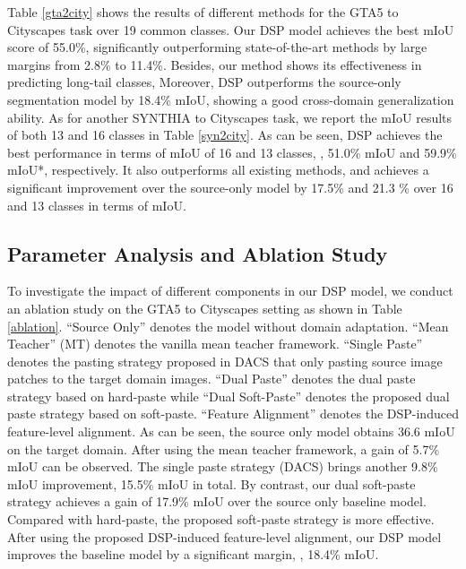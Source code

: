 \documentclass[sigconf]{acmart}
\begin{document}
Table \ref{gta2city} shows the results of different methods for the GTA5 to Cityscapes task over 19 common classes. Our DSP model achieves the best mIoU score of 55.0\%, significantly outperforming state-of-the-art methods by large margins from 2.8\% to 11.4\%. Besides, our method shows its effectiveness in predicting long-tail classes, Moreover, DSP outperforms the source-only segmentation model by 18.4\% mIoU, showing a good cross-domain generalization ability. As for another SYNTHIA to Cityscapes task, we report the mIoU results of both 13 and 16 classes in Table \ref{syn2city}. As can be seen, DSP achieves the best performance in terms of mIoU of 16 and 13 classes, , 51.0\% mIoU and 59.9\% mIoU*, respectively. It also outperforms all existing methods, and achieves a significant improvement over the source-only model by 17.5\% and 21.3 \% over 16 and 13 classes in terms of mIoU. 


\subsection{Parameter Analysis and Ablation Study}
\label{subsec:ablationstudy}
To investigate the impact of different components in our DSP model, we conduct an ablation study on the GTA5 to Cityscapes setting as shown in Table \ref{ablation}. ``Source Only'' denotes the model without domain adaptation. ``Mean Teacher'' (MT) denotes the vanilla mean teacher framework. ``Single Paste'' denotes the pasting strategy proposed in DACS \cite{dacs} that only pasting source image patches to the target domain images. ``Dual Paste'' denotes the dual paste strategy based on hard-paste while ``Dual Soft-Paste'' denotes the proposed dual paste strategy based on soft-paste. ``Feature Alignment'' denotes the DSP-induced feature-level alignment. As can be seen, the source only model obtains 36.6 mIoU on the target domain. After using the mean teacher framework, a gain of 5.7\% mIoU can be observed. The single paste strategy (DACS) brings another 9.8\% mIoU improvement, 15.5\% mIoU in total. By contrast, our dual soft-paste strategy achieves a gain of 17.9\% mIoU over the source only baseline model. Compared with hard-paste, the proposed soft-paste strategy is more effective. After using the proposed DSP-induced feature-level alignment, our DSP model improves the baseline model by a significant margin, , 18.4\% mIoU. 
\end{document}
